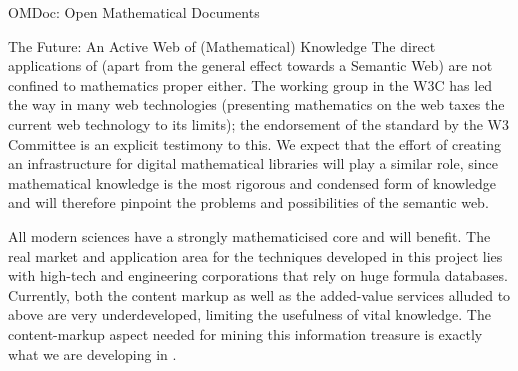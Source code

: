 \begin{tchapter}[id=omdoc-markup,short=Open Mathematical Documents]{OMDoc: Open Mathematical Documents}
\begin{tsection}[id=mathweb]{The Future: An Active Web of (Mathematical) Knowledge}
The direct applications of {\omdoc} (apart from the general effect towards a Semantic Web)
are not confined to mathematics proper either.  The {\mathml} working group in the W3C has
led the way in many web technologies (presenting mathematics on the web taxes the current
web technology to its limits); the endorsement of the {\mathml} standard by the W3
Committee is an explicit testimony to this. We expect that the effort of creating an
infrastructure for digital mathematical libraries will play a similar role, since
mathematical knowledge is the most rigorous and condensed form of knowledge and will
therefore pinpoint the problems and possibilities of the semantic web.

All modern sciences have a strongly mathematicised core and will benefit. The real market
and application area for the techniques developed in this project lies with high-tech and
engineering corporations that rely on huge formula databases.  Currently, both the content
markup as well as the added-value services alluded to above are very underdeveloped,
limiting the usefulness of vital knowledge. The content-markup aspect needed for mining
this information treasure is exactly what we are developing in {\omdoc}.
\end{tsection}
\end{tchapter}




